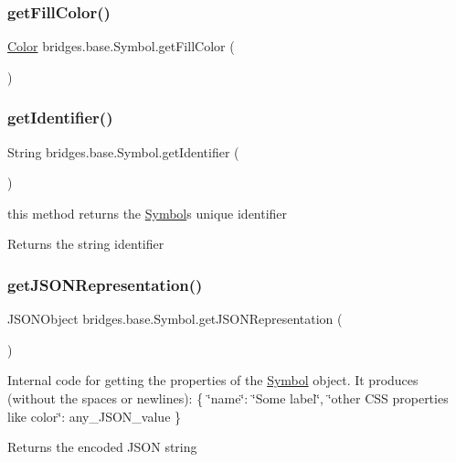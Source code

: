 \subsubsection{\texorpdfstring{get\+Fill\+Color()}{getFillColor()}}
{\footnotesize\ttfamily \mbox{\hyperlink{classbridges_1_1base_1_1_color}{Color}} bridges.\+base.\+Symbol.\+get\+Fill\+Color (\begin{DoxyParamCaption}{ }\end{DoxyParamCaption})}

\mbox{\label{classbridges_1_1base_1_1_symbol_a53cea862b06ffc230ca68d4d34c8820d}} 
\subsubsection{\texorpdfstring{get\+Identifier()}{getIdentifier()}}
{\footnotesize\ttfamily String bridges.\+base.\+Symbol.\+get\+Identifier (\begin{DoxyParamCaption}{ }\end{DoxyParamCaption})}

this method returns the \mbox{\hyperlink{classbridges_1_1base_1_1_symbol}{Symbol}}\textquotesingle{}s unique identifier \begin{DoxyReturn}{Returns}
the string identifier 
\end{DoxyReturn}
\mbox{\label{classbridges_1_1base_1_1_symbol_aeba4cfa5b39fe03e72a568a8b7452e60}} 
\subsubsection{\texorpdfstring{get\+J\+S\+O\+N\+Representation()}{getJSONRepresentation()}}
{\footnotesize\ttfamily J\+S\+O\+N\+Object bridges.\+base.\+Symbol.\+get\+J\+S\+O\+N\+Representation (\begin{DoxyParamCaption}{ }\end{DoxyParamCaption})}

Internal code for getting the properties of the \mbox{\hyperlink{classbridges_1_1base_1_1_symbol}{Symbol}} object. It produces (without the spaces or newlines)\+: \{ \char`\"{}name\char`\"{}\+: \char`\"{}\+Some label\char`\"{}, \char`\"{}other C\+S\+S properties like color\char`\"{}\+: any\+\_\+\+J\+S\+O\+N\+\_\+value \} \begin{DoxyReturn}{Returns}
the encoded J\+S\+ON string 
\end{DoxyReturn}
\mbox{\label{classbridges_1_1base_1_1_symbol_a7616c25b288a6e464f4f0b5fe4bd2826}} 
